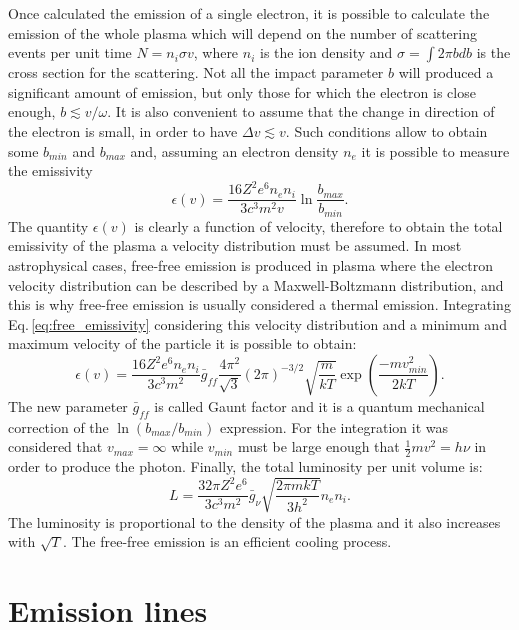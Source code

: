 \documentclass[../thesis.tex]{subfiles}
\begin{document}
Once calculated the emission of a single electron, it is possible to calculate the emission of the whole plasma which will depend on the number of scattering events per unit time $N = n_i \sigma v$, where $n_i$ is the ion density and $\sigma = \int 2\pi b db$ is the cross section for the scattering.
Not all the impact parameter $b$ will produced a significant amount of emission, but only those for which the electron is close enough, $b\lesssim v/\omega$. 
It is also convenient to assume that the change in direction of the electron is small, in order to have $\Delta v \lesssim v$.
Such conditions allow to obtain some $b_{min}$ and $b_{max}$ and, assuming an electron density $n_e$ it is possible to measure the emissivity
\begin{equation}
    \label{eq:free_emissivity} 
    \epsilon(v) = \frac{16 Z^2 e^6 n_e n_i}{3c^3m^2v}\ln\frac{b_{max}}{b_{min}}.
\end{equation}
The quantity $\epsilon(v)$ is clearly a function of velocity, therefore to obtain the total emissivity of the plasma a velocity distribution must be assumed.
In most astrophysical cases, free-free emission is produced in plasma where the electron velocity distribution can be described by a Maxwell-Boltzmann distribution, and this is why free-free emission is usually considered a thermal emission.
Integrating Eq.\,\ref{eq:free_emissivity} considering this velocity distribution and a minimum and maximum velocity of the particle it is possible to obtain:
\begin{equation}
    \label{eq:free_emissivity_total}
    \epsilon(v) = \frac{16 Z^2 e^6 n_e n_i}{3c^3m^2}\bar{g}_{ff}\frac{4\pi^2}{\sqrt 3}(2\pi)^{-3/2}\sqrt{\frac{m}{kT}} \exp\left(\frac{-mv^2_{min}}{2kT}\right).
\end{equation}
The new parameter $\bar{g}_{ff}$ is called Gaunt factor and it is a quantum mechanical correction of the $\ln(b_{max}/b_{min})$ expression.
For the integration it was considered that $v_{max} = \infty$ while $v_{min}$ must be large enough that $\frac{1}{2}mv^2 = h\nu$ in order to produce the photon.
Finally, the total luminosity per unit volume is:
\begin{equation}
    \label{eq:free_lum_tot}
    L=\frac{32 \pi Z^2 e^6}{3c^3m^2}\bar{g}_{\nu}\sqrt{\frac{2 \pi m k T}{3h^2}}n_e n_i.
\end{equation}
The luminosity is proportional to the density of the plasma and it also increases with $\sqrt T$.
The free-free emission is an efficient cooling process.


\section{Emission lines}
\label{sec:emission_line}
\end{document}
